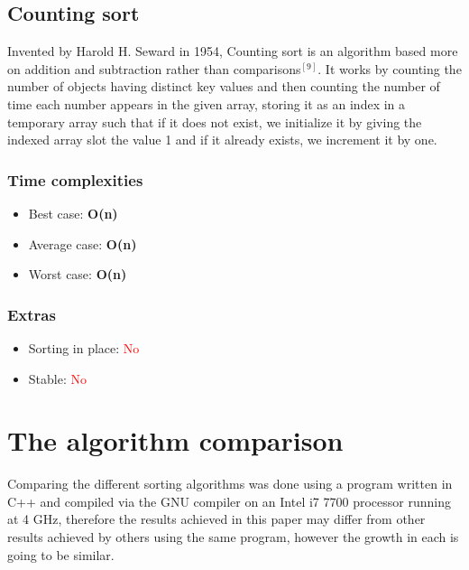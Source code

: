 \documentclass{article}
\begin{document}
\begin{multicols}{2}
\bigbreak \bigbreak \bigbreak \bigbreak \bigbreak \bigbreak \bigbreak \bigbreak \bigbreak \bigbreak \bigbreak \bigbreak \bigbreak \bigbreak \bigbreak \bigbreak \bigbreak \bigbreak \bigbreak \bigbreak



\subsection{Counting sort}
Invented by Harold H. Seward in 1954, Counting sort is an algorithm based more on addition and subtraction rather than comparisons$^{[9]}$. It works by counting the number of objects having distinct key values and then counting the number of time each number appears in the given array, storing it as an index in a temporary array such that if it does not exist, we initialize it by giving the indexed array slot the value 1 and if it already exists, we increment it by one.
\subsubsection{Time complexities}
\begin{itemize}
    \item Best case: \textbf{O(n)}
    \item Average case: \textbf{O(n)}
    \item Worst case: \textbf{O(n)}
\end{itemize}

\subsubsection{Extras}
\begin{itemize}
    \item Sorting in place: \textcolor{red}{No}
    \item Stable: \textcolor{red}{No}
\end{itemize}

\bigbreak \bigbreak \bigbreak \bigbreak \bigbreak \bigbreak \bigbreak \bigbreak \bigbreak \bigbreak \bigbreak \bigbreak \bigbreak \bigbreak \bigbreak \bigbreak \bigbreak \bigbreak \bigbreak \bigbreak


\end{multicols}
\clearpage


\section{The algorithm comparison}
Comparing the different sorting algorithms was done using a program written in C++ and compiled via the GNU compiler on an Intel i7 7700 processor running at 4 GHz, therefore the results achieved in this paper may differ from other results achieved by others using the same program, however the growth in each is going to be similar. 
\end{document}

